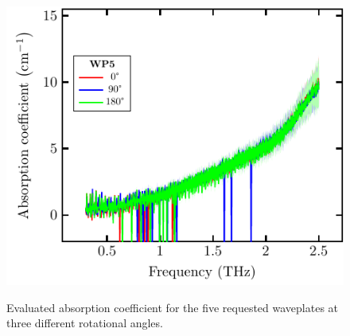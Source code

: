 \begin{figure}[H]
\subcaptionbox{\label{fig:ceramic_WP5_abs}}
    {\includegraphics[width=0.45\linewidth]{images/appendix/plots/real_abs/WP5.pdf}}
\caption{Evaluated absorption coefficient for the five requested waveplates at three different rotational angles.}
\label{fig:ceramic_WPs_abs}
\end{figure}

